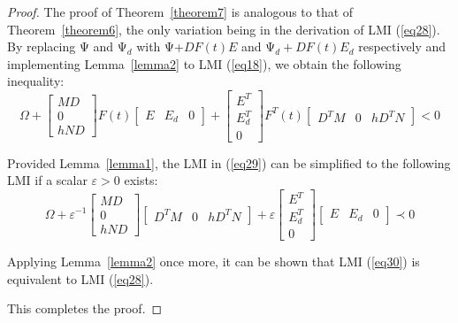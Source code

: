 \documentclass[a4paper]{cas-sc}
\newtheorem*{proof}{Proof}
\begin{document}
\begin{proof}
The proof of Theorem~\ref{theorem7} is analogous to that of Theorem~\ref{theorem6}, the only variation being in the derivation of LMI (\ref{eq28}). By replacing $\mathrm{\Psi}$ and $\mathrm{\Psi}_d$ with $\mathrm{\Psi}$+$DF(t)E$ and $\mathrm{\Psi}_d+DF(t)E_d$ respectively and implementing Lemma~\ref{lemma2} to LMI (\ref{eq18}), we obtain the following inequality:
  \begin{equation}
    \Omega+\left[\begin{array}{c}
      M D \\
      0 \\
      h N D
      \end{array}\right] F(t)\left[\begin{array}{lll}
      E & E_d & 0
      \end{array}\right]+\left[\begin{array}{c}
      E^T \\
      E_d^T \\
      0
      \end{array}\right] F^T(t)\left[\begin{array}{lll}
      D^T M & 0 & h D^T N
      \end{array}\right]<0
\label{eq29}
\end{equation} 

Provided Lemma~\ref{lemma1}, the LMI in (\ref{eq29}) can be simplified to the following LMI if a scalar $\varepsilon>0$ exists:
\begin{equation}
    \Omega+\varepsilon^{-1}\left[\begin{array}{c}
      M D \\
      0 \\
      h N D
      \end{array}\right]\left[\begin{array}{lll}
      D^T M & 0 & h D^T N
      \end{array}\right]+\varepsilon\left[\begin{array}{c}
      E^T \\
      E_d^T \\
      0
      \end{array}\right]\left[\begin{array}{lll}
      E & E_d & 0
      \end{array}\right] \prec 0
\label{eq30}
\end{equation} 

Applying Lemma~\ref{lemma2} once more, it can be shown that LMI (\ref{eq30}) is equivalent to LMI (\ref{eq28}).


This completes the proof.

\end{proof}
\end{document}
